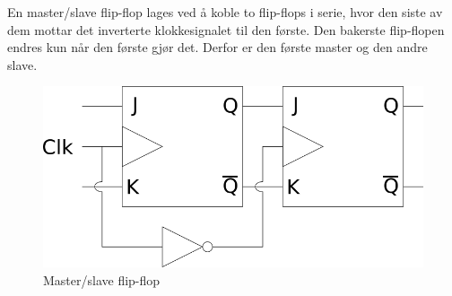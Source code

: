 En master/slave flip-flop lages ved å koble to flip-flops i serie, hvor den
siste av dem mottar det inverterte klokkesignalet til den første.
Den bakerste flip-flopen endres kun når den første gjør det.
Derfor er den første master og den andre slave.
\begin{figure}[H]
  \caption{Master/slave flip-flop}
  \centering
  \includegraphics[width=\textwidth]{./img/master-slave}
\end{figure}
